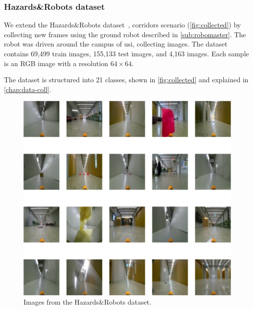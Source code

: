     \subsubsection{Hazards\&Robots dataset}
    We extend the Hazards\&Robots dataset~\cite{mantegazza2022outlier}, corridors scenario (\autoref{fig:collected}) by collecting new frames using the ground robot described in \autoref{sub:robomaster}. The robot was driven around the campus of \acrfull{usi}, collecting images. The dataset contains 69,499 train images, 155,133 test images, and 4,163 images. Each sample is an RGB image with a resolution $64\times 64$.

    The dataset is structured into 21 classes, shown in \autoref{fig:collected} and explained in \autoref{chap:data-coll}.
    \begin{figure}[H]
        \centering
        \centerline{\includegraphics[width=\textwidth]{img/RM-Dataset.png}}
        \caption{Images from the Hazards\&Robots dataset.}
        \label{fig:collected}
    \end{figure}
    
